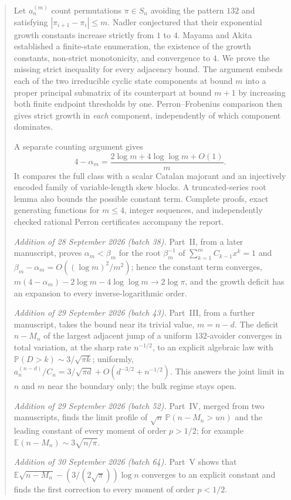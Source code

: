 \documentclass[11pt,a4paper]{article}
\theoremstyle{definition}\newaliascnt{definition}{theorem}
\theoremstyle{remark}\newaliascnt{remark}{theorem}
\begin{document}
\begin{abstract}
Let $a_n^{(m)}$ count permutations $\pi\in S_n$ avoiding the pattern $132$ and
satisfying $|\pi_{i+1}-\pi_i|\le m$. Nadler conjectured that their exponential
growth constants increase strictly from $1$ to $4$. Mayama and Akita established
a finite-state enumeration, the existence of the growth constants,
non-strict monotonicity, and convergence to $4$. We prove the missing strict
inequality for every adjacency bound. The argument embeds each of the two
irreducible cyclic state components at bound $m$ into a proper principal
submatrix of its counterpart at bound $m+1$ by increasing both finite endpoint
thresholds by one. Perron--Frobenius comparison then gives strict growth in
\emph{each} component, independently of which component dominates.

A separate counting argument gives
\[
 4-\alpha_m=\frac{2\log m+4\log\log m+O(1)}{m}.
\]
It compares the full class with a scalar Catalan majorant and an injectively
encoded family of variable-length skew blocks. A truncated-series root lemma
also bounds the possible constant term. Complete proofs, exact generating
functions for $m\le4$, integer sequences, and independently checked rational
Perron certificates accompany the report.

\emph{Addition of 28 September 2026 (batch 38).} Part~II, from a later
manuscript, proves $\alpha_m<\beta_m$ for the root $\beta_m^{-1}$ of
$\sum_{k=1}^mC_{k-1}x^k=1$ and $\beta_m-\alpha_m=O((\log m)^2/m^2)$; hence the
constant term converges, $m(4-\alpha_m)-2\log m-4\log\log m\to2\log\pi$, and
the growth deficit has an expansion to every inverse-logarithmic order.

\emph{Addition of 29 September 2026 (batch 43).} Part~III, from a further
manuscript, takes the bound near its trivial value, $m=n-d$. The deficit
$n-M_n$ of the largest adjacent jump of a uniform $132$-avoider converges in
total variation, at the sharp rate $n^{-1/2}$, to an explicit algebraic law
with $\mathbb P(D>k)\sim3/\sqrt{\pi k}$; uniformly,
$a_n^{(n-d)}/C_n=3/\sqrt{\pi d}+O(d^{-3/2}+n^{-1/2})$. This answers the joint
limit in $n$ and $m$ near the boundary only; the bulk regime stays open.

\emph{Addition of 29 September 2026 (batch 52).} Part~IV, merged from two
manuscripts, finds the limit profile of $\sqrt n\,\mathbb P(n-M_n>un)$ and the
leading constant of every moment of order $p>1/2$; for example
$\mathbb E(n-M_n)\sim3\sqrt{n/\pi}$.

\emph{Addition of 30 September 2026 (batch 64).} Part~V shows that
$\mathbb E\sqrt{n-M_n}-(3/(2\sqrt\pi))\log n$ converges to an explicit
constant and finds the first correction to every moment of order $p<1/2$.


\end{abstract}
\end{document}

